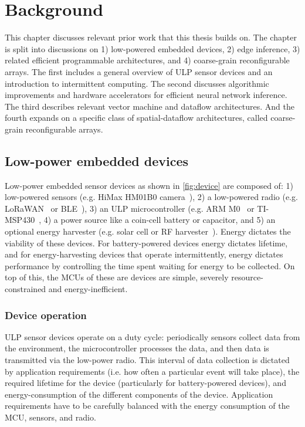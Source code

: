 \chapter{Background}
\label{chapter:background}

This chapter discusses relevant prior work that this thesis builds on.
% 
The chapter is split into discussions on 1) low-powered embedded devices, 2) edge inference, 3) related efficient programmable architectures, and 4) coarse-grain reconfigurable arrays.
% 
The first includes a general overview of ULP sensor devices and an introduction to intermittent computing.
% 
The second discusses algorithmic improvements and hardware accelerators for efficient neural network inference.
% 
The third describes relevant vector machine and dataflow architectures.
% 
And the fourth expands on a specific class of spatial-dataflow architectures, called coarse-grain reconfigurable arrays.
% 

\figDevice
\section{Low-power embedded devices}

Low-power embedded sensor devices as shown in \autoref{fig:device} are composed of: 1) low-powered sensors (e.g. HiMax HM01B0 camera~\cite{hm01b0}), 2) a low-powered radio (e.g. LoRaWAN~\cite{lorawan} or BLE~\cite{ble}), 3) an ULP microcontroller (e.g. ARM M0~\cite{cortexm0} or TI-MSP430~\cite{msp430fr5994}, 4) a power source like a coin-cell battery or capacitor, and 5) an optional energy harvester (e.g. solar cell or RF harvester~\cite{powercast}).
% 
Energy dictates the viability of these devices.
% 
For battery-powered devices energy dictates lifetime, and for energy-harvesting devices that operate intermittently, energy dictates performance by controlling the time spent waiting for energy to be collected.
% 
On top of this, the MCUs of these are devices are simple, severely resource-constrained and energy-inefficient.

\subsection{Device operation}
% 
ULP sensor devices operate on a duty cycle: periodically sensors collect data from the environment, the microcontroller processes the data, and then data is transmitted via the low-power radio.
% 
This interval of data collection is dictated by application requirements (i.e. how often a particular event will take place), the required lifetime for the device (particularly for battery-powered devices), and energy-consumption of the different components of the device.
% 
% 
Application requirements have to be carefully balanced with the energy consumption of the MCU, sensors, and radio.

